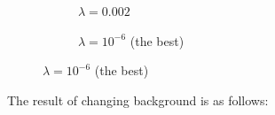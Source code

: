 \documentclass[paper=a4, fontsize=11pt]{scrartcl} %
\numberwithin{equation}{section} %
\numberwithin{figure}{section} %
\numberwithin{table}{section} %
\begin{document}
\begin{figure}[H]
\begin{subfigure}[b]{0.45\textwidth}
{		}
	\caption{$\lambda = 0.002$}
	\end{subfigure}
	\begin{subfigure}[b]{0.45\textwidth}
		\noindent{}
	\caption{$\lambda = 10^{-6}$ (the best)}
	\end{subfigure}
\end{figure}

The result of changing background is as follows:
\end{document}
